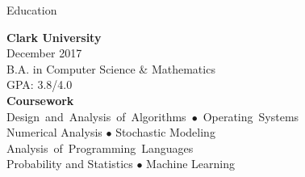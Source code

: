 \documentclass{resume} %
\newcommand{\mybullet}[0]{\textcolor{mygray}{$\bullet$} }
\begin{document}

\begin{rSection}{Education}

\color{jobcolor}
\begin{vwcol}[widths={0.45, 0.55}, indent=0pt, rule=0pt]
\textcolor{jobcolor}{\textbf{Clark University}}\\
\textcolor{mygray}{December 2017} \\
B.A. in Computer Science \& Mathematics \\
GPA: 3.8/4.0
\vspace{5 mm}
\\


\textcolor{jobcolor}{\textbf{Coursework}} \\ \mbox{Design and Analysis of Algorithms \mybullet Operating Systems}\\
Numerical Analysis \mybullet Stochastic Modeling \\
\mbox{Analysis of Programming Languages}\\ Probability and Statistics \mybullet Machine Learning


\end{vwcol}

\end{rSection}

\end{document}
